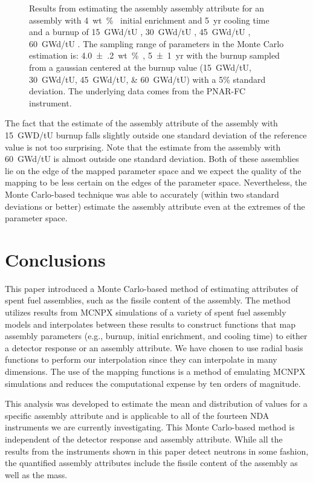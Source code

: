 \documentclass{ansnse}
\begin{document}
\begin{figure}[hp]
\caption{Results from estimating the assembly assembly attribute for an assembly with \SI{4}{wt \% } initial enrichment and \SI{5}{yr} cooling time and a burnup of \SI{15}{GWd/tU} , \SI{30}{GWd/tU} , \SI{45}{GWd/tU} , \SI{60}{GWd/tU} .  The sampling range of parameters in the Monte Carlo estimation is: \SI{4.0(2)}{wt \% }, \SI{5(1)}{yr} with the burnup sampled from a gaussian centered at the burnup value (\SIlist[list-final-separator={, or }]{15; 30; 45; 60}{GWd/tU}) with a 5\% standard deviation.  The underlying data comes from the PNAR-FC instrument.}
    \label{fig:AltLimited}
\end{figure}

The fact that the estimate of the assembly attribute of the assembly with \SI{15}{GWD/tU} burnup falls slightly outside one standard deviation of the reference value is not too surprising.  Note that the estimate from the assembly with \SI{60}{GWd/tU} is almost outside one standard deviation.  Both of these assemblies lie on the edge of the mapped parameter space and we expect the quality of the mapping to be less certain on the edges of the parameter space.  Nevertheless, the Monte Carlo-based technique was able to accurately (within two standard deviations or better) estimate the assembly attribute even at the extremes of the parameter space.  
\section{Conclusions}\label{sec:Conclusions}
This paper introduced a Monte Carlo-based method of estimating attributes of spent fuel assemblies, such as the fissile content of the assembly.  The method utilizes results from MCNPX simulations of a variety of spent fuel assembly models and interpolates between these results to construct functions that map assembly parameters (e.g., burnup, initial enrichment, and cooling time) to either a detector response or an assembly attribute.  We have chosen to use radial basis functions to perform our interpolation since they can interpolate in many dimensions.  The use of the mapping functions is a method of emulating MCNPX simulations and reduces the computational expense by ten orders of magnitude.  

This analysis was developed to estimate the mean and distribution of values for a specific assembly attribute and is applicable to all of the fourteen NDA instruments we are currently investigating.  This Monte Carlo-based method is independent of the detector response and assembly attribute.  While all the results from the instruments shown in this paper detect neutrons in some fashion, the quantified assembly attributes include the fissile content of the assembly as well as the  mass.
\end{document}
